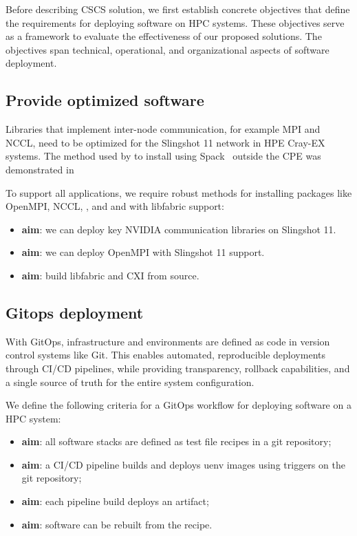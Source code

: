 Before describing CSCS solution, we first establish concrete objectives that define the requirements for deploying software on HPC systems. These objectives serve as a framework to evaluate the effectiveness of our proposed solutions. The objectives span technical, operational, and organizational aspects of software deployment.

\subsection{Provide optimized software}

Libraries that implement inter-node communication, for example MPI and NCCL, need to be optimized for the Slingshot 11 network in HPE Cray-EX systems.
The method used by \stackinator to install \craympich using Spack~\cite{gamblin:sc15} outside the CPE was demonstrated in~\cite{uenv2023} 

To support all applications, we require robust methods for installing packages like OpenMPI, NCCL, \nvshmem, \cufftmp and \cusolvermp and with libfabric support:
\begin{itemize}
    \item \textbf{aim}: we can deploy key NVIDIA communication libraries on Slingshot 11.
    \item \textbf{aim}: we can deploy OpenMPI with Slingshot 11 support.
    \item \textbf{aim}: build libfabric and CXI from source.
\end{itemize}

\subsection{Gitops deployment}

With GitOps, infrastructure and environments are defined as code in version control systems like Git.
This enables automated, reproducible deployments through CI/CD pipelines, while providing transparency, rollback capabilities, and a single source of truth for the entire system configuration.

We define the following criteria for a GitOps workflow for deploying software on a HPC system:
\begin{itemize}
    \item \textbf{aim}: all software stacks are defined as test file recipes in a git repository;
    \item \textbf{aim}: a CI/CD pipeline builds and deploys uenv images using triggers on the git repository;
    \item \textbf{aim}: each pipeline build deploys an artifact;
    \item \textbf{aim}: software can be rebuilt from the recipe.
\end{itemize}

